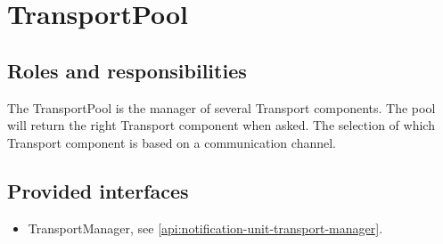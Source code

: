 \section{TransportPool}
\label{element:transport-pool}

\subsection{Roles and responsibilities}

\npar The TransportPool is the manager of several Transport components. The
pool will return the right Transport component when asked. The selection of
which Transport component is based on a communication channel.

\subsection{Provided interfaces}

\begin{itemize}
  \item TransportManager, see \ref{api:notification-unit-transport-manager}.
\end{itemize}